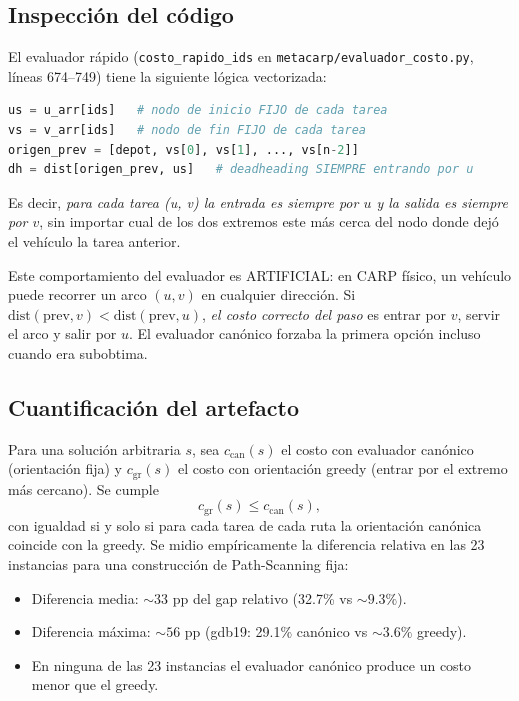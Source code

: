 \documentclass[11pt,a4paper]{article}
\theoremstyle{definition}
\theoremstyle{remark}
\begin{document}
\subsection{Inspección del código}

El evaluador rápido (\texttt{costo\_rapido\_ids} en
\texttt{metacarp/evaluador\_costo.py}, líneas 674--749) tiene la
siguiente lógica vectorizada:

\begin{lstlisting}[language=Python]
us = u_arr[ids]   # nodo de inicio FIJO de cada tarea
vs = v_arr[ids]   # nodo de fin FIJO de cada tarea
origen_prev = [depot, vs[0], vs[1], ..., vs[n-2]]
dh = dist[origen_prev, us]   # deadheading SIEMPRE entrando por u
\end{lstlisting}

Es decir, \emph{para cada tarea (u, v) la entrada es siempre por $u$ y
la salida es siempre por $v$}, sin importar cual de los dos extremos
este más cerca del nodo donde dejó el vehículo la tarea anterior.

Este comportamiento del evaluador es ARTIFICIAL: en CARP físico, un
vehículo puede recorrer un arco $(u, v)$ en cualquier dirección. Si
$\mathrm{dist}(\text{prev}, v) < \mathrm{dist}(\text{prev}, u)$,
\emph{el costo correcto del paso} es entrar por $v$, servir el arco y
salir por $u$. El evaluador canónico forzaba la primera opción incluso
cuando era subobtima.

\subsection{Cuantificación del artefacto}

Para una solución arbitraria $s$, sea $c_{\text{can}}(s)$ el costo
con evaluador canónico (orientación fija) y $c_{\text{gr}}(s)$ el
costo con orientación greedy (entrar por el extremo más cercano). Se
cumple
\[ c_{\text{gr}}(s) \le c_{\text{can}}(s), \]
con igualdad si y solo si para cada tarea de cada ruta la orientación
canónica coincide con la greedy. Se midio empíricamente la diferencia
relativa en las 23 instancias para una construcción de Path-Scanning
fija:

\begin{itemize}
\item Diferencia media: $\sim 33$ pp del gap relativo (32.7\% vs
  $\sim 9.3\%$).
\item Diferencia máxima: $\sim 56$ pp (gdb19: 29.1\% canónico vs
  $\sim 3.6\%$ greedy).
\item En ninguna de las 23 instancias el evaluador canónico produce
  un costo menor que el greedy.
\end{itemize}
\end{document}
